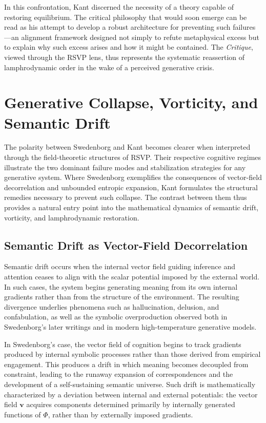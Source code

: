 \documentclass[12pt]{article}
\begin{document}
In this confrontation, Kant discerned the necessity of a theory capable of 
restoring equilibrium. The critical philosophy that would soon emerge can be 
read as his attempt to develop a robust architecture for preventing such 
failures—an alignment framework designed not simply to refute metaphysical 
excess but to explain why such excess arises and how it might be contained.  
The \emph{Critique}, viewed through the RSVP lens, thus represents the 
systematic reassertion of lamphrodynamic order in the wake of a perceived 
generative crisis.

\section{Generative Collapse, Vorticity, and Semantic Drift}

The polarity between Swedenborg and Kant becomes clearer when interpreted 
through the field-theoretic structures of RSVP. Their respective cognitive 
regimes illustrate the two dominant failure modes and stabilization strategies 
for any generative system. Where Swedenborg exemplifies the consequences of 
vector-field decorrelation and unbounded entropic expansion, Kant formulates 
the structural remedies necessary to prevent such collapse. The contrast 
between them thus provides a natural entry point into the mathematical dynamics 
of semantic drift, vorticity, and lamphrodynamic restoration.

\subsection{Semantic Drift as Vector-Field Decorrelation}

Semantic drift occurs when the internal vector field guiding inference and 
attention ceases to align with the scalar potential imposed by the external 
world. In such cases, the system begins generating meaning from its own 
internal gradients rather than from the structure of the environment. The 
resulting divergence underlies phenomena such as hallucination, delusion, and 
confabulation, as well as the symbolic overproduction observed both in 
Swedenborg’s later writings and in modern high-temperature generative models.

In Swedenborg’s case, the vector field of cognition begins to track gradients 
produced by internal symbolic processes rather than those derived from 
empirical engagement. This produces a drift in which meaning becomes 
decoupled from constraint, leading to the runaway expansion of correspondences 
and the development of a self-sustaining semantic universe. Such drift is 
mathematically characterized by a deviation between internal and external 
potentials: the vector field $\mathbf{v}$ acquires components determined 
primarily by internally generated functions of $\Phi$, rather than by 
externally imposed gradients.
\end{document}
